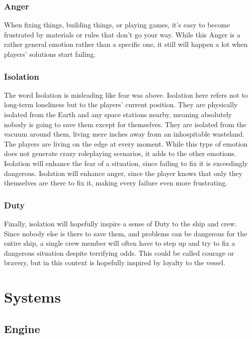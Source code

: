 \documentclass[a4paper]{article}
\begin{document}
\subsubsection{Anger} \label{anger}

When fixing things, building things, or playing games, it's easy to become frustrated by materials or rules that don't go your way. While this Anger is a rather general emotion rather than a specific one, it still will happen a lot when players' solutions start failing. 

\subsubsection{Isolation} \label{isolation}

The word Isolation is misleading like fear was above. Isolation here refers not to long-term loneliness but to the players' current position. They are physically isolated from the Earth and any space stations nearby, meaning absolutely nobody is going to save them except for themselves. They are isolated from the vacuum around them, living mere inches away from an inhospitable wasteland. The players are living on the edge at every moment. While this type of emotion does not generate crazy roleplaying scenarios, it adds to the other emotions. Isolation will enhance the fear of a situation, since failing to fix it is exceedingly dangerous. Isolation will enhance anger, since the player knows that only they themselves are there to fix it, making every failure even more frustrating. 

\subsubsection{Duty} \label{duty}

Finally, isolation will hopefully inspire a sense of Duty to the ship and crew. Since nobody else is there to save them, and problems can be dangerous for the entire ship, a single crew member will often have to step up and try to fix a dangerous situation despite terrifying odds. This could be called courage or bravery, but in this context is hopefully inspired by loyalty to the vessel.


\newpage
\section{Systems} \label{systems}

\subsection{Engine} \label{engine}
\end{document}

